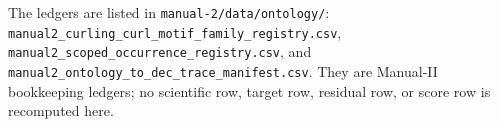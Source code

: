 The ledgers are listed in \texttt{manual-2/data/ontology/}: \texttt{manual2\_curling\_curl\_motif\_family\_registry.csv}, \texttt{manual2\_scoped\_occurrence\_registry.csv}, and \texttt{manual2\_ontology\_to\_dec\_trace\_manifest.csv}. They are Manual-II bookkeeping ledgers; no scientific row, target row, residual row, or score row is recomputed here.
